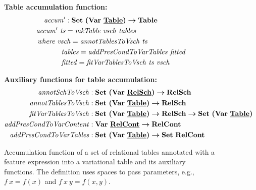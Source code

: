 \begin{figure}[ht!]

\textbf{Table accumulation function:}
\begin{alignat*}{1}
\VVal {\mathit{accum}} &:  \settype {\bm{(}\vartype \pTabSet\bm{)}} \totype \tabletype\\
\VVal {\mathit{accum}} \ \mathit{ts} &= \mathit{mkTable} \ \mathit{vsch} \ \mathit{tables}\\
&\hspace{-40pt}\textit{where }
\mathit{vsch} = \mathit{annotTablesToVsch}  \ \mathit{ts}\\
&\hspace{-6pt} \mathit{tables} = \mathit{addPresCondToVarTables} \ \mathit {fitted}\\
&\hspace{-6pt} \mathit{fitted} = \mathit{fitVarTablesToVsch} \ \mathit{ts} \ \mathit{vsch}
\end{alignat*}


\medskip 
\textbf{Auxiliary functions for table accumulation:}
\footnotesize
\begin{alignat*}{1}
\mathit{annotSchToVsch} &:  \settype {\bm{(}\vartype \pRelSchSet\bm{)}} \totype \vRelSchSet\\
\mathit{annotTablesToVsch} &:  \settype {\bm{(}\vartype \pTabSet\bm{)}} \totype \vRelSchSet\\
\mathit{fitVarTablesToVsch} &: \settype {\bm{(}\vartype \pTabSet\bm{)}} \totype \vRelSchSet \totype \settype {\bm{(}\vartype \pTabSet\bm{)}}\\
\mathit{addPresCondToVarContent} &:  \vartype \pRelContSet \totype \vRelContSet\\
\mathit{addPresCondToVarTables} &:  \settype {\bm{(}\vartype \pTabSet\bm{)}} \totype \settype \vRelContSet
\end{alignat*}


\caption[Accumulation function of a set of relational tables annotated with a feature expression into a variational table]{Accumulation function of a set of relational tables annotated with a feature expression into a variational table and its auxiliary functions. The definition uses spaces to pass parameters, e.g., $f \ x = f(x)$ and $f \ x \ y = f(x,y)$.
}
\label{fig:accum2}
\end{figure}

